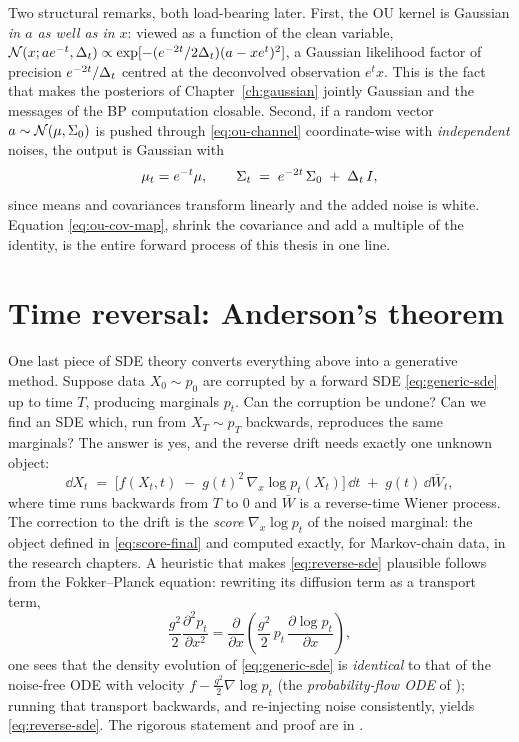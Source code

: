 Two structural remarks, both load-bearing later. First, the OU kernel is
Gaussian \emph{in $a$ as well as in $x$}: viewed as a function of the
clean variable,
$\mathcal{N}(x; a e^{-t}, \Delta_t) \propto
\exp[-(e^{-2t}/2\Delta_t)(a - x e^{t})^2]$, a Gaussian likelihood factor
of precision $e^{-2t}/\Delta_t$ centred at the deconvolved observation
$e^t x$. This is the fact that makes the posteriors of
Chapter~\ref{ch:gaussian} jointly Gaussian and the messages of the BP
computation closable. Second, if a random vector
$a \sim \mathcal{N}(\mu, \Sigma_0)$ is pushed through \eqref{eq:ou-channel}
coordinate-wise with \emph{independent} noises, the output is Gaussian
with
\begin{equation}
  \mu_t = e^{-t}\mu,
  \qquad
  \Sigma_t \;=\; e^{-2t}\, \Sigma_0 \;+\; \Delta_t\, I ,
  \label{eq:ou-cov-map}
\end{equation}
since means and covariances transform linearly and the added noise is
white. Equation \eqref{eq:ou-cov-map}, shrink the covariance and add a
multiple of the identity, is the entire forward process of this thesis in
one line.

\section{Time reversal: Anderson's theorem}\label{sec:reversal}

One last piece of SDE theory converts everything above into a generative
method. Suppose data $X_0 \sim p_0$ are corrupted by a forward SDE
\eqref{eq:generic-sde} up to time $T$, producing marginals $p_t$. Can the
corruption be undone? Can we find an SDE which, run from $X_T \sim p_T$
backwards, reproduces the same marginals? The answer
\citep{anderson1982reverse} is yes, and the reverse drift needs exactly
one unknown object:
\begin{equation}
  \dd X_t \;=\;
  \Big[ f(X_t, t) \;-\; g(t)^2\, \nabla_x \log p_t(X_t) \Big]\,\dd t
  \;+\; g(t)\, \dd \bar W_t ,
  \label{eq:reverse-sde}
\end{equation}
where time runs backwards from $T$ to $0$ and $\bar W$ is a reverse-time
Wiener process. The correction to the drift is the \emph{score}
$\nabla_x \log p_t$ of the noised marginal: the object defined in
\eqref{eq:score-final} and computed exactly, for Markov-chain data, in
the research chapters. A heuristic that makes \eqref{eq:reverse-sde}
plausible follows from the Fokker--Planck equation: rewriting its
diffusion term as a transport term,
\begin{equation*}
  \frac{g^2}{2} \frac{\partial^2 p_t}{\partial x^2}
  = \frac{\partial}{\partial x}\!\left(
      \frac{g^2}{2}\, p_t\, \frac{\partial \log p_t}{\partial x}
    \right),
\end{equation*}
one sees that the density evolution of \eqref{eq:generic-sde} is
\emph{identical} to that of the noise-free ODE with velocity
$f - \tfrac{g^2}{2} \nabla \log p_t$ (the \emph{probability-flow ODE} of
\citealp{song2021scorebased}); running that transport backwards, and
re-injecting noise consistently, yields \eqref{eq:reverse-sde}. The
rigorous statement and proof are in \citet{anderson1982reverse}.


